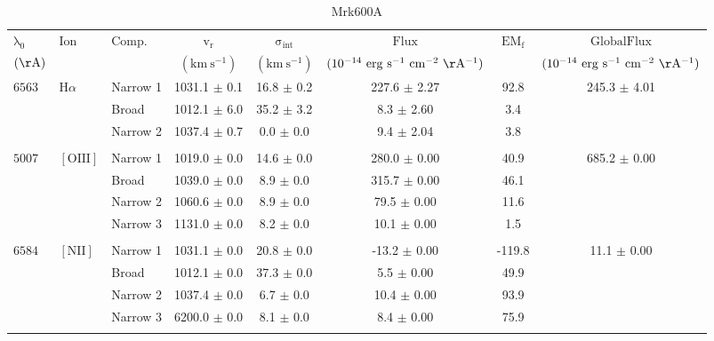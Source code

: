 \documentclass{article}
\begin{document}
\begin{table}[tbp]
\centering
\begin{tabular}{lllccccc}
\hline
$\mathrm{\lambda_0}$ & $\mathrm{Ion}$ & $\mathrm{Comp.}$ & $\mathrm{v_r}$ & $\mathrm{\sigma_{int}}$ & $\mathrm{Flux}$ & $\mathrm{EM_f}$ & $\mathrm{GlobalFlux}$ \\ 
$(\mathrm{\AA})$ &  &  & $(\mathrm{km \ s^{-1}})$ & $(\mathrm{km \ s^{-1}})$ & $(\mathrm{10^{-14} \ erg \ s^{-1} \ cm^{-2} \ \AA^{-1}})$ &  & $(\mathrm{10^{-14} \ erg \ s^{-1} \ cm^{-2} \ \AA^{-1}})$ \\ 
\hline
$6563$ & $\mathrm{H}\alpha$ & Narrow 1 & 1031.1 $\pm$ 0.1 & 16.8 $\pm$ 0.2 & 227.6 $\pm$ 2.27 & 92.8 & 245.3 $\pm$ 4.01 \\ 
 &  & Broad & 1012.1 $\pm$ 6.0 & 35.2 $\pm$ 3.2 & 8.3 $\pm$ 2.60 & 3.4 &  \\ 
 &  & Narrow 2 & 1037.4 $\pm$ 0.7 & 0.0 $\pm$ 0.0 & 9.4 $\pm$ 2.04 & 3.8 &  \\ 
 &  &  &  &  &  &  &  \\ 
$5007$ & $\mathrm{[OIII]}$ & Narrow 1 & 1019.0 $\pm$ 0.0 & 14.6 $\pm$ 0.0 & 280.0 $\pm$ 0.00 & 40.9 & 685.2 $\pm$ 0.00 \\ 
 &  & Broad & 1039.0 $\pm$ 0.0 & 8.9 $\pm$ 0.0 & 315.7 $\pm$ 0.00 & 46.1 &  \\ 
 &  & Narrow 2 & 1060.6 $\pm$ 0.0 & 8.9 $\pm$ 0.0 & 79.5 $\pm$ 0.00 & 11.6 &  \\ 
 &  & Narrow 3 & 1131.0 $\pm$ 0.0 & 8.2 $\pm$ 0.0 & 10.1 $\pm$ 0.00 & 1.5 &  \\ 
 &  &  &  &  &  &  &  \\ 
$6584$ & $\mathrm{[NII]}$ & Narrow 1 & 1031.1 $\pm$ 0.0 & 20.8 $\pm$ 0.0 & -13.2 $\pm$ 0.00 & -119.8 & 11.1 $\pm$ 0.00 \\ 
 &  & Broad & 1012.1 $\pm$ 0.0 & 37.3 $\pm$ 0.0 & 5.5 $\pm$ 0.00 & 49.9 &  \\ 
 &  & Narrow 2 & 1037.4 $\pm$ 0.0 & 6.7 $\pm$ 0.0 & 10.4 $\pm$ 0.00 & 93.9 &  \\ 
 &  & Narrow 3 & 6200.0 $\pm$ 0.0 & 8.1 $\pm$ 0.0 & 8.4 $\pm$ 0.00 & 75.9 &  \\ 
 &  &  &  &  &  &  &  \\ 
\hline
\end{tabular}
\caption{Mrk600A}
\end{table}
\end{document}
